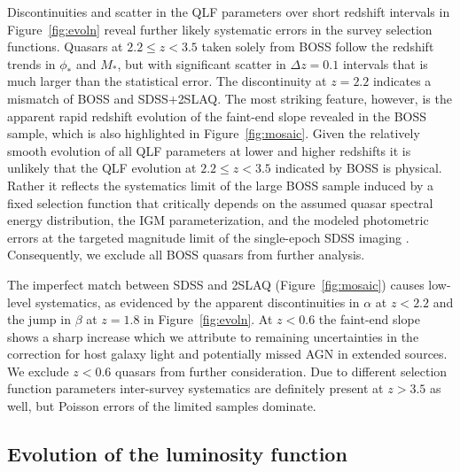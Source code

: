 \documentclass[fleqn,usenatbib]{mnras}
\begin{document}
Discontinuities and scatter in the QLF parameters over short redshift
intervals in Figure~\ref{fig:evoln} reveal further likely systematic
errors in the survey selection functions.  Quasars at $2.2\le z<3.5$
taken solely from BOSS \citep{2013ApJ...773...14R} follow the redshift
trends in $\phi_*$ and $M_*$, but with significant scatter in $\Delta
z=0.1$ intervals that is much larger than the statistical error.  The
discontinuity at $z=2.2$ indicates a mismatch of BOSS and
SDSS$+$2SLAQ. The most striking feature, however, is the apparent
rapid redshift evolution of the faint-end slope revealed in the BOSS
sample, which is also highlighted in Figure~\ref{fig:mosaic}. Given
the relatively smooth evolution of all QLF parameters at lower and
higher redshifts it is unlikely that the QLF evolution at $2.2\le
z<3.5$ indicated by BOSS is physical.  Rather it reflects the
systematics limit of the large BOSS sample induced by a fixed
selection function that critically depends on the assumed quasar
spectral energy distribution, the IGM parameterization, and the
modeled photometric errors at the targeted magnitude limit of the
single-epoch SDSS imaging
\citep{2011ApJ...728...23W, 2012ApJS..199....3R, 2013ApJ...773...14R}.
Consequently, we exclude all BOSS quasars from further analysis.

The imperfect match between SDSS and 2SLAQ (Figure~\ref{fig:mosaic})
causes low-level systematics, as evidenced by the apparent
discontinuities in $\alpha$ at $z<2.2$ and the jump in $\beta$ at
$z=1.8$ in Figure~\ref{fig:evoln}.  At $z<0.6$ the faint-end slope
shows a sharp increase which we attribute to remaining uncertainties
in the correction for host galaxy light and potentially missed AGN in
extended sources. We exclude $z<0.6$ quasars from further
consideration. Due to different selection function parameters
inter-survey systematics are definitely present at $z>3.5$ as well,
but Poisson errors of the limited samples dominate.

\subsection{Evolution of the luminosity function}
\label{sec:global}
\end{document}
